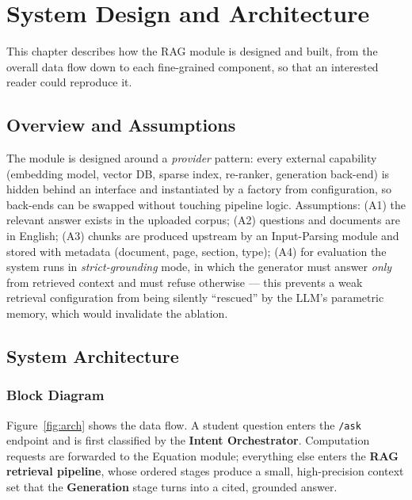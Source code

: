 \documentclass[12pt,a4paper]{report}
\begin{document}
\chapter{System Design and Architecture}
This chapter describes how the RAG module is designed and built, from the overall
data flow down to each fine-grained component, so that an interested reader could
reproduce it.

\section{Overview and Assumptions}
The module is designed around a \emph{provider} pattern: every external capability
(embedding model, vector DB, sparse index, re-ranker, generation back-end) is
hidden behind an interface and instantiated by a factory from configuration, so
back-ends can be swapped without touching pipeline logic. Assumptions: (A1) the
relevant answer exists in the uploaded corpus; (A2) questions and documents are in
English; (A3) chunks are produced upstream by an Input-Parsing module and stored
with metadata (document, page, section, type); (A4) for evaluation the system runs
in \emph{strict-grounding} mode, in which the generator must answer \emph{only}
from retrieved context and must refuse otherwise --- this prevents a weak
retrieval configuration from being silently ``rescued'' by the LLM's parametric
memory, which would invalidate the ablation.

\section{System Architecture}
\subsection{Block Diagram}
Figure~\ref{fig:arch} shows the data flow. A student question enters the
\texttt{/ask} endpoint and is first classified by the \textbf{Intent
Orchestrator}. Computation requests are forwarded to the Equation module;
everything else enters the \textbf{RAG retrieval pipeline}, whose ordered stages
produce a small, high-precision context set that the \textbf{Generation} stage
turns into a cited, grounded answer.
\end{document}
